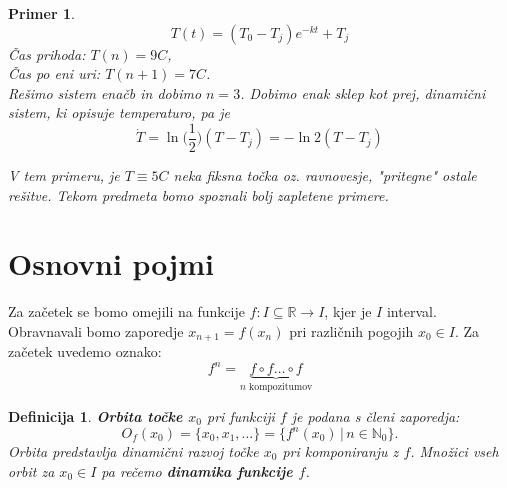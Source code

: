 \documentclass{article}
\newtheorem{definicija}{Definicija}
\newtheorem{primer}{Primer}
\newcommand{\N}{\mathbb{N}}
\newcommand{\R}{\mathbb{R}}
\begin{document}
\begin{primer}
$$
T(t) = (T_0 - T_j)e^{-kt} + T_j
$$
Čas prihoda: $T(n) = 9C$, \\ 
Čas po eni uri: $T(n+1) = 7C$.\\ 
Rešimo sistem enačb in dobimo $n = 3$. Dobimo enak sklep kot prej, dinamični sistem, ki opisuje temperaturo, pa je
$$
\dot{T} = \ln\Big(\frac{1}{2}\Big)(T - T_j) = -\ln{2}(T-T_j)
$$


\vspace{1cm}
V tem primeru, je $T \equiv 5C$ neka fiksna točka oz. ravnovesje, "pritegne" ostale rešitve. Tekom predmeta bomo spoznali bolj zapletene primere.
\end{primer}

\maketitle
\section{Osnovni pojmi}
Za začetek se bomo omejili na funkcije $f: I\subseteq \R \rightarrow I$, kjer je $I$ interval. Obravnavali bomo zaporedje $x_{n+1} = f(x_n)$ pri različnih pogojih $x_0 \in I$. Za začetek uvedemo oznako:
$$
f^n = \underbrace{f\circ f \dots \circ f}_{n \text{ kompozitumov} }
$$
\begin{definicija}
\textbf{Orbita točke $x_0$} pri funkciji $f$ je podana s členi zaporedja:
$$
O_f(x_0) = \{x_0, x_1, \dots\} = \{f^n(x_0)\,|\, n\in \N_0\}.
$$
Orbita predstavlja dinamični razvoj točke $x_0$ pri komponiranju z $f$. 
Množici vseh orbit za $x_0 \in I$ pa rečemo \textbf{dinamika funkcije $f$}.
\end{definicija}
\end{document}
